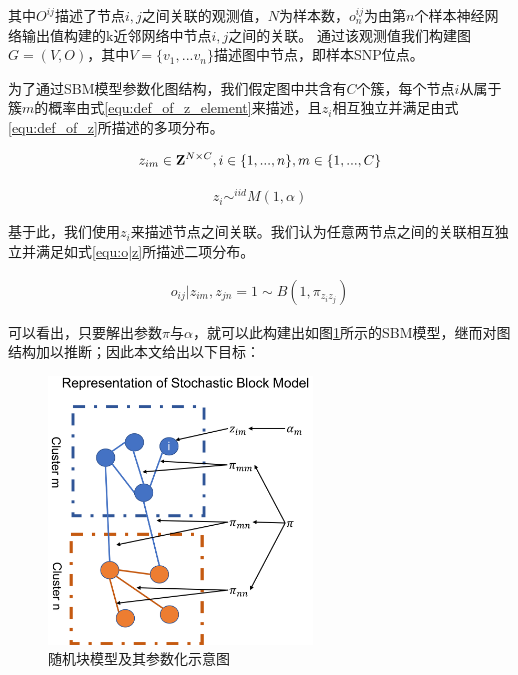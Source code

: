 其中$O^{ij}$描述了节点$i,j$之间关联的观测值，$N$为样本数，$o^{ij}_n$为由第$n$个样本神经网络输出值构建的k近邻网络中节点$i,j$之间的关联。
通过该观测值我们构建图$G=(V,O)$，其中$V=\{v_1,...v_n\}$描述图中节点，即样本SNP位点。

为了通过SBM模型参数化图结构，我们假定图中共含有$C$个簇，每个节点$i$从属于簇$m$的概率由式\ref{equ:def_of_z_element}来描述，且$z_i$相互独立并满足由式\ref{equ:def_of_z}所描述的多项分布。

\begin{equation}\label{equ:def_of_z_element}
  z_{im}\in \bold{Z}^{N\times C},i\in \{1, ... ,n\},m\in\{1,...,C\}
\end{equation}

\begin{equation}\label{equ:def_of_z}
  \begin{aligned}
    z_i \mathop{\sim}^{iid} M(1,\alpha)
  \end{aligned}
\end{equation}

基于此，我们使用$z_i$来描述节点之间关联。我们认为任意两节点之间的关联相互独立并满足如式\ref{equ:o|z}所描述二项分布。

\begin{equation}\label{equ:o|z}
  \begin{aligned}
    o_{ij}|z_{im},z_{jn} = 1 \sim B(1,\pi_{z_iz_j})
  \end{aligned}
\end{equation}


可以看出，只要解出参数$\pi$与$\alpha$，就可以此构建出如图\ref{fig:SBM}所示的SBM模型，继而对图结构加以推断；因此本文给出以下目标：

\begin{figure}[!ht]
  \centering
  \includegraphics[width=7cm]{./figures/Chapter3/SBM.png}
  \caption{随机块模型及其参数化示意图} \label{fig:SBM}
\end{figure}

